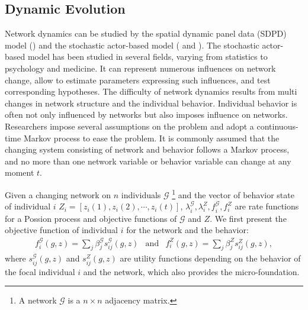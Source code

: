 \documentclass[a4paper]{article}
\theoremstyle{plain}
\begin{document}
\subsection{Dynamic Evolution}
Network dynamics can be studied by the spatial dynamic panel data (SDPD) model
(\citet{sdpd})
and the stochastic actor-based model (\citet{sto} and \citet{storev}).
The stochastic actor-based model has been studied in
several fields, varying from statistics to psychology and medicine. 
It can represent numerous
influences on network change, allow to estimate
parameters expressing such influences, 
and test corresponding hypotheses.
The difficulty of network dynamics results from multi changes in network structure
and the individual behavior. Individual behavior is often not only 
influenced by networks but also imposes influence on networks.
Researchers impose several assumptions on the problem and adopt a continuous-time Markov process
to ease the problem. It is commonly assumed that the changing system consisting of 
network and behavior follows a Markov process, and no more than one network variable
or behavior variable can change at any moment $t$.

Given a changing network on $n$ individuals $\mathscr{G}$
\footnote{A network $\mathscr{G}$ is a $n\times n$ adjacency matrix.}
and the vector of behavior state of
individual $i$ $Z_i=[z_i(1), z_i(2),\cdots,z_i(t)]$, 
$\lambda_i^\mathscr{G},\lambda_i^Z,f_i^\mathscr{G}, f_i^Z$
are rate functions for a Possion process 
and objective functions of $\mathscr{G}$ and $Z$.
We first present the objective function of
individual $i$ for the network
and the behavior:
\[
    \begin{array}{CCC}
        f_i^\mathscr{G}(g,z)=\sum_{j}\beta_j^\mathscr{G}s_{ij}^\mathscr{G}(g,z)
        & \text{and} &
        f_i^Z(g,z)=\sum_{j}\beta_j^Zs_{ij}^Z(g,z),%
    \end{array}
\]
where $s_{ij}^\mathscr{G}(g,z)$ and $s_{ij}^Z(g,z)$ are utility functions
depending on the behavior of the focal individual $i$ and the network,
which also provides the micro-foundation.
\end{document}
